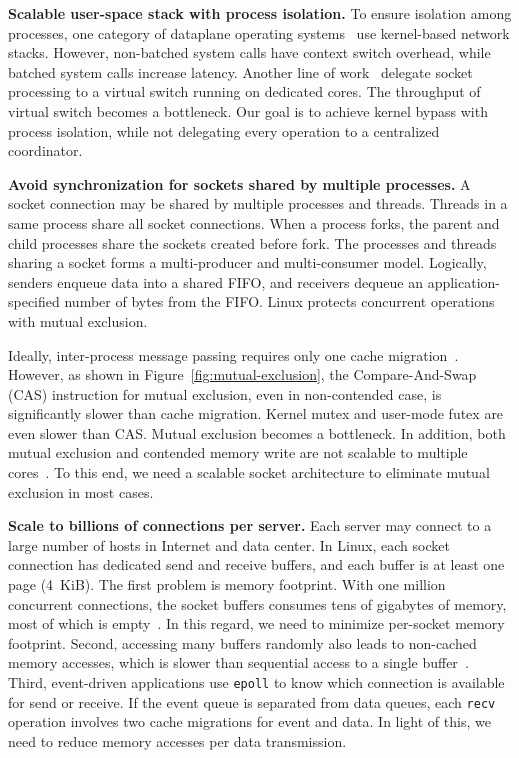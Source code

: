 \textbf{Scalable user-space stack with process isolation.}
To ensure isolation among processes, one category of dataplane operating systems~\cite{belay2014ix,tsai2017lite} use kernel-based network stacks. However, non-batched system calls have context switch overhead, while batched system calls increase latency. Another line of work~\cite{martins2014clickos,roghanchi2017ffwd,huang2017high} delegate socket processing to a virtual switch running on dedicated cores. The throughput of virtual switch becomes a bottleneck. Our goal is to achieve kernel bypass with process isolation, while not delegating every operation to a centralized coordinator.

\textbf{Avoid synchronization for sockets shared by multiple processes.}
A socket connection may be shared by multiple processes and threads. Threads in a same process share all socket connections. When a process forks, the parent and child processes share the sockets created before fork. The processes and threads sharing a socket forms a multi-producer and multi-consumer model. Logically, senders enqueue data into a shared FIFO, and receivers dequeue an application-specified number of bytes from the FIFO. Linux protects concurrent operations with mutual exclusion.

Ideally, inter-process message passing requires only one cache migration~\cite{roghanchi2017ffwd}. However, as shown in Figure~\ref{fig:mutual-exclusion}, the Compare-And-Swap (CAS) instruction for mutual exclusion, even in non-contended case, is significantly slower than cache migration. Kernel mutex and user-mode futex are even slower than CAS. Mutual exclusion becomes a bottleneck. In addition, both mutual exclusion and contended memory write are not scalable to multiple cores~\cite{boyd2014optimizing}. To this end, we need a scalable socket architecture to eliminate mutual exclusion in most cases.

\textbf{Scale to billions of connections per server.}
Each server may connect to a large number of hosts in Internet and data center. In Linux, each socket connection has dedicated send and receive buffers, and each buffer is at least one page (4~KiB). The first problem is memory footprint. With one million concurrent connections, the socket buffers consumes tens of gigabytes of memory, most of which is empty~\cite{lin2016scalable}. In this regard, we need to minimize per-socket memory footprint. Second, accessing many buffers randomly also leads to non-cached memory accesses, which is slower than sequential access to a single buffer~\cite{li2017kv}. Third, event-driven applications use \texttt{epoll} to know which connection is available for send or receive. If the event queue is separated from data queues, each \texttt{recv} operation involves two cache migrations for event and data. In light of this, we need to reduce memory accesses per data transmission.

